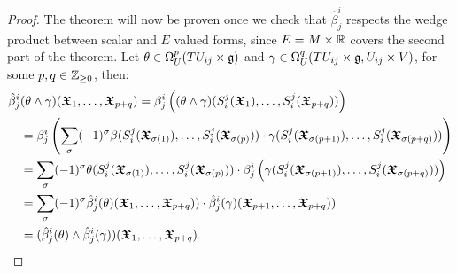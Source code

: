 \begin{proof}
The theorem will now be proven once we check that $\hat \beta^i_j$ respects the wedge product between scalar and $E$ valued forms, since $E = M \times \mathbb{R}$ covers the second part of the theorem. Let $\theta \in \Omega^p_U(TU_{ij}\times \mathfrak{g})$ and $\gamma \in \Omega^q_U(TU_{ij}\times \mathfrak{g}, U_{ij} \times V)$, for some $p, q \in \mathbb{Z}_{\geq 0}$, then:
\begin{align*}
    \hat \beta^i_j&(\theta \wedge \gamma)(\bm{\mathfrak{X}}_1, \dots, \bm{\mathfrak{X}}_{p+q}) 
    = \beta^i_j\left( (\theta \wedge \gamma)(S^j_i(\bm{\mathfrak{X}}_1), \dots, S^j_i(\bm{\mathfrak{X}}_{p+q})) \right) \\
    &= \beta^i_j\left( \sum_{\sigma}(-1)^\sigma \beta(S^j_i(\bm{\mathfrak{X}}_{\sigma(1)}), \dots, S^j_i(\bm{\mathfrak{X}}_{\sigma(p)})) \cdot \gamma(S^j_i(\bm{\mathfrak{X}}_{\sigma(p+1)}), \dots, S^j_i(\bm{\mathfrak{X}}_{\sigma(p+q)})) \right) \\
    &=  \sum_{\sigma}(-1)^\sigma \theta(S^j_i(\bm{\mathfrak{X}}_{\sigma(1)}), \dots, S^j_i(\bm{\mathfrak{X}}_{\sigma(p)})) \cdot \beta^i_j\left(\gamma(S^j_i(\bm{\mathfrak{X}}_{\sigma(p+1)}), \dots, S^j_i(\bm{\mathfrak{X}}_{\sigma(p+q)}))\right) \\
    &= \sum_{\sigma}(-1)^\sigma \hat \beta^i_j(\theta)(\bm{\mathfrak{X}}_1, \dots, \bm{\mathfrak{X}}_{p+q})) \cdot \hat \beta^i_j(\gamma)(\bm{\mathfrak{X}}_{p+1}, \dots, \bm{\mathfrak{X}}_{p+q}))\\
    &= (\hat \beta^i_j(\theta) \wedge \hat \beta^i_j(\gamma))(\bm{\mathfrak{X}}_1, \dots, \bm{\mathfrak{X}}_{p+q}).
\end{align*}

\end{proof}

